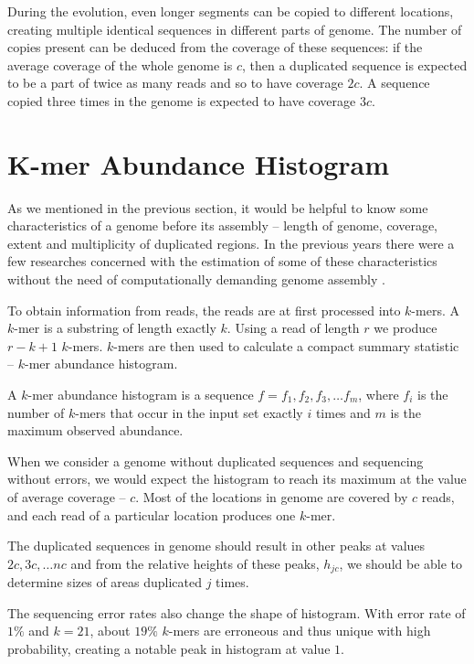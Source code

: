 During the evolution, even longer segments can be copied to different locations, 
creating multiple identical sequences in different parts of genome. The number of copies present 
can be deduced from the coverage of these sequences: if the average coverage of the whole genome 
is $c$, then a duplicated sequence is expected to be a part of twice as many reads and so to
have coverage $2c$. A sequence copied three times in the genome is expected to have coverage $3c$.


\section{K-mer Abundance Histogram}
As we mentioned in the previous section, it would be helpful to know some characteristics of a genome before its assembly -- 
length of genome, coverage, extent and multiplicity of duplicated regions. In the previous years there were a few
researches concerned with the estimation of some of these characteristics without the need of computationally demanding 
genome assembly \cite{Hozza2015, Melsted2014, Sivadasan2016}. 

To obtain information from reads, the reads are at first processed into $k$-mers. A $k$-mer is a substring of length exactly $k$.
Using a read of length $r$ we produce $r-k+1$ $k$-mers. $k$-mers are then used to calculate a compact summary statistic -- $k$-mer 
abundance histogram. 

\begin{definition}
A $k$-mer abundance histogram is a sequence $f = f_1, f_2, f_3, \dots f_m$, where $f_i$ is the number of $k$-mers that occur in
the input set exactly $i$ times and $m$ is the maximum observed abundance.
\end{definition}

When we consider a genome without duplicated sequences and sequencing without errors, we would expect the histogram
to reach its maximum at the value of average coverage -- $c$. Most of the locations in genome are covered by $c$ reads,
and each read of a particular location produces one $k$-mer.

The duplicated sequences in genome should result in other peaks at values $2c, 3c, \dots nc$ and from the relative heights of these peaks, $h_{jc}$,
we should be able to determine sizes of areas duplicated $j$ times.

The sequencing error rates also change the shape of histogram. With error rate of $1\%$ and $k=21$, about $19\%$ $k$-mers are
erroneous and thus unique with high probability, creating a notable peak in histogram at value $1$. 


